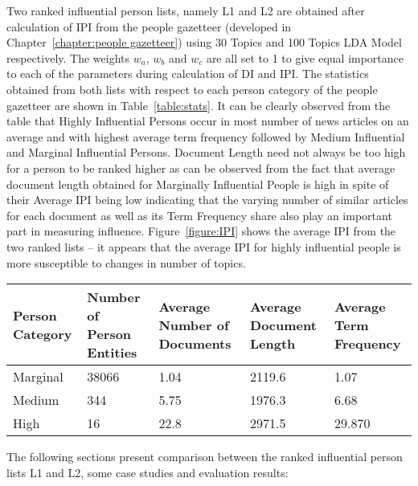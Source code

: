 Two ranked influential person lists, namely L1 and L2 are obtained after calculation of IPI from the people gazetteer (developed in Chapter~\ref{chapter:people gazetteer}) using 30 Topics and 100 Topics LDA Model respectively. The weights $w_a$, $w_b$ and $w_c$ are all set to 1 to give equal importance to each of the parameters during calculation of DI and IPI. The statistics obtained from both lists with respect to each person category of the people gazetteer are shown in Table~\ref{table:stats}. 
It can be clearly observed from the table that Highly Influential Persons occur in most number of news articles on an average and with highest average term frequency followed by Medium Influential and Marginal Influential Persons.
Document Length need not always be too high for a person to be ranked higher as can be observed from the fact that average document length obtained for Marginally Influential People is high in spite of their Average IPI being low indicating that the varying number of similar articles for each document as well as its Term Frequency share also play an important part in measuring influence. Figure~\ref{figure:IPI} shows the average IPI from the two ranked lists -- it appears that the average IPI for highly influential people is more susceptible to changes in number of topics.

\begin{table*}
\begin{center}

    \begin{tabular}{|p{2cm}|p{2cm}|p{2cm}|p{2cm}|p{2cm}|}
    \hline
    \textbf{Person Category}  &  \textbf{Number of Person Entities}   & \textbf{Average Number of Documents}   &  \textbf{Average Document Length}	&  \textbf{Average Term Frequency}	\\  \hline
Marginal & 38066 & 1.04 & 2119.6 & 1.07 	\\ \hline
Medium & 344 & 5.75 & 1976.3 & 6.68  \\ \hline
High & 16 & 22.8 & 2971.5 & 29.870	 \\	\hline 
  \end{tabular}
  \end{center}
    \caption {Table illustrating average statistics for each Person Category of People Gazetteer across 2 Topic Models}
\label{table:stats}
\end{table*}


The following sections present comparison between the ranked influential person lists L1 and L2, some case studies and evaluation results:
 
